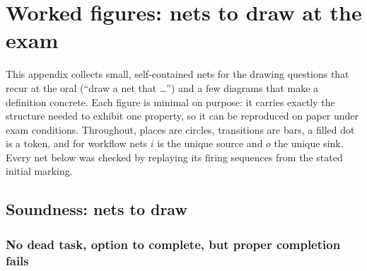 \appendix
\section{Worked figures: nets to draw at the exam}

This appendix collects small, self-contained nets for the drawing questions that recur at the oral (``draw a net that \dots'') and a few diagrams that make a definition concrete. Each figure is minimal on purpose: it carries exactly the structure needed to exhibit one property, so it can be reproduced on paper under exam conditions. Throughout, places are circles, transitions are bars, a filled dot is a token, and for workflow nets $i$ is the unique source and $o$ the unique sink. Every net below was checked by replaying its firing sequences from the stated initial marking.

\subsection{Soundness: nets to draw}

\subsubsection{No dead task, option to complete, but proper completion fails}

